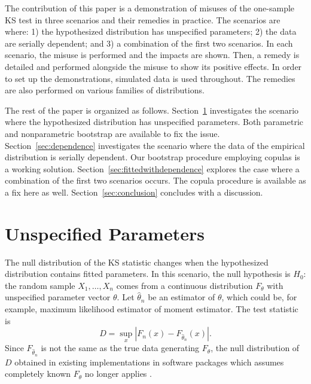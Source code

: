 \documentclass[12pt, letterpaper, titlepage]{article}
\begin{document}
The contribution of this paper is a demonstration of misuses of the one-sample
KS test in three scenarios and their remedies in practice. The scenarios are 
where:
1) the hypothesized distribution has unspecified parameters;
2) the data are serially dependent; and
3) a combination of the first two scenarios. 
In each scenario, the misuse is performed and the impacts are shown. Then, a
remedy is detailed and performed alongside the misuse to show its positive 
effects. In order to set up the demonstrations, simulated data is used 
throughout. The remedies are also performed on various families of 
distributions.

The rest of the paper is organized as follows. Section~\ref{sec:fitted}
investigates the scenario where the hypothesized distribution has unspecified
parameters. Both parametric and nonparametric bootstrap are available to fix the
issue. Section~\ref{sec:dependence} investigates the scenario where the data of 
the empirical distribution is serially dependent. Our bootstrap procedure 
employing copulas is a working solution. Section~\ref{sec:fittedwithdependence}
explores the case where a combination of the first two scenarios occurs. The 
copula procedure is available as a fix here as well. 
Section~\ref{sec:conclusion} concludes with a discussion.

\section{Unspecified Parameters}
\label{sec:fitted}

The null distribution of the KS statistic changes when the hypothesized
distribution contains fitted parameters. In this scenario, the null hypothesis
is $H_0$: the random sample $X_1, \ldots, X_n$ comes from a continuous
distribution $F_{\theta}$ with unspecified parameter vector $\theta$.
Let $\hat\theta_n$ be an estimator of $\theta$, which could be, for example,
maximum likelihood estimator of moment estimator. The test statistic is
\begin{equation}
  \label{eq:ks_fitted}
  D = \sup_x | F_n(x) - F_{\hat\theta_n}(x) |.
\end{equation}
Since $F_{\hat\theta_n}$ is not the same as the true data generating
$F_\theta$, the null distribution of $D$ obtained in existing implementations in
software packages which assumes completely known $F_\theta$ no longer applies
\citep{Steinskog}.
\end{document}
